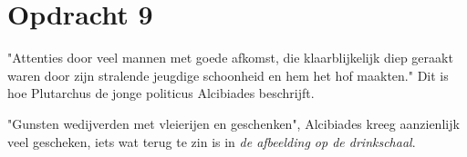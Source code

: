 \documentclass[11pt]{amsart}
\begin{document}
\section*{Opdracht 9}
"Attenties door veel mannen met goede afkomst, die klaarblijkelijk diep geraakt waren door zijn stralende jeugdige schoonheid en hem het hof maakten."\autocite{plutarchusLevenVanAlcibiades120}
Dit is hoe Plutarchus de jonge politicus Alcibiades beschrijft.

"Gunsten wedijverden met vleierijen en geschenken", Alcibiades kreeg aanzienlijk veel gescheken, iets wat terug te zin is in \textit{de afbeelding op de drinkschaal}\autocite{dourisAtticRedFigure}.
\end{document}
